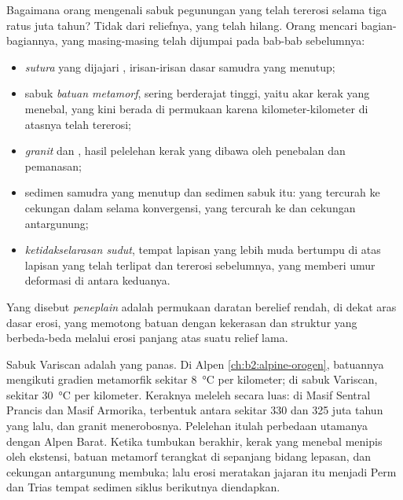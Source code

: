 Bagaimana orang mengenali sabuk pegunungan yang telah tererosi selama tiga ratus juta tahun?
Tidak dari reliefnya, yang telah hilang. Orang mencari bagian-bagiannya, yang masing-masing telah dijumpai
pada bab-bab sebelumnya:
\begin{itemize}
\item \emph{sutura} yang dijajari \emph{}, irisan-irisan dasar samudra yang menutup;
\item sabuk \emph{batuan metamorf}, sering berderajat tinggi, yaitu akar kerak yang menebal,
yang kini berada di permukaan karena kilometer-kilometer di atasnya telah tererosi;
\item \emph{granit} dan \emph{}, hasil pelelehan kerak yang dibawa oleh
penebalan dan pemanasan;
\item sedimen samudra yang menutup dan sedimen sabuk itu: \emph{} yang tercurah ke cekungan dalam
selama konvergensi, \emph{} yang tercurah ke  dan cekungan antargunung;
\item \emph{ketidakselarasan sudut}, tempat lapisan yang lebih muda bertumpu di atas lapisan yang telah terlipat dan
tererosi sebelumnya, yang memberi umur deformasi di antara keduanya.
\end{itemize}

\begin{definition}[Peneplain]\label{def:b2:wilson-cycle:peneplain}
Yang disebut \emph{peneplain} adalah permukaan daratan berelief rendah, di dekat aras dasar
erosi, yang memotong batuan dengan kekerasan dan struktur yang berbeda-beda melalui erosi panjang atas suatu
relief lama.
\end{definition}

Sabuk Variscan adalah  yang panas. Di Alpen \cref{ch:b2:alpine-orogen}, batuannya
mengikuti gradien metamorfik sekitar \qty{8}{\celsius} per kilometer; di sabuk Variscan,
sekitar \qty{30}{\celsius} per kilometer. Keraknya meleleh secara luas: di Masif Sentral Prancis
dan Masif Armorika,  terbentuk antara sekitar 330 dan 325 juta tahun yang lalu, dan
granit menerobosnya. Pelelehan itulah perbedaan utamanya dengan Alpen Barat. Ketika
tumbukan berakhir, kerak yang menebal menipis oleh ekstensi, batuan metamorf terangkat
di sepanjang bidang lepasan, dan cekungan antargunung membuka; lalu erosi meratakan jajaran itu menjadi
 Perm dan Trias tempat sedimen siklus berikutnya diendapkan.

